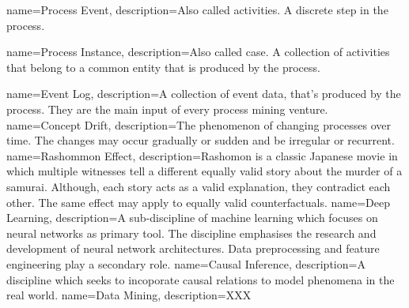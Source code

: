  {
}


{
        name=Process Event,
        description={Also called activities. A discrete step in the process.}
}

{
        name=Process Instance,
        description={Also called case. A collection of activities that belong to a common entity that is produced by the process.}
}

{
        name=Event Log,
        description={A collection of event data, that's produced by the process. They are the main input of every process mining venture.}
}
{
        name=Concept Drift,
        description={The phenomenon of changing processes over time. The changes may occur gradually or sudden and be irregular or recurrent.}
}
{
        name=Rashommon Effect,
        description={Rashomon is a classic Japanese movie in which multiple witnesses tell a different equally valid story about the murder of a samurai. Although, each story acts as a valid explanation, they contradict each other. The same effect may apply to equally valid counterfactuals.}
}
{
        name=Deep Learning,
        description={A sub-discipline of machine learning which focuses on neural networks as primary tool. The discipline emphasises the research and development of neural network architectures. Data preprocessing and feature engineering play a secondary role.}
}
{
        name=Causal Inference,
        description={A discipline which seeks to incoporate causal relations to model phenomena in the real world.}
}
{
        name=Data Mining,
        description={XXX}
}
